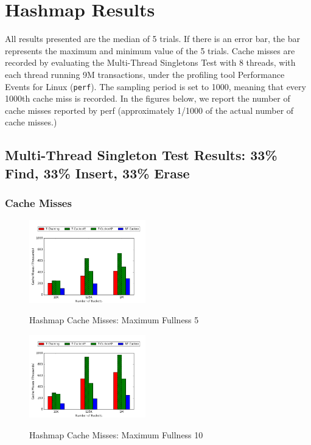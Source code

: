 \chapter{Hashmap Results}
\label{app:hashmaps}

All results presented are the median of 5 trials. If there is an error bar, the bar represents the maximum and minimum value of the 5 trials.
Cache misses are recorded by evaluating the Multi-Thread Singletons Test with 8 threads, with each thread running 9M transactions, under the profiling tool Performance Events for Linux (\texttt{perf}). The sampling period is set to 1000, meaning that every 1000th cache miss is recorded.
In the figures below, we report the number of cache misses reported by perf (approximately 1/1000 of the actual number of cache misses.)

\section{Multi-Thread Singleton Test Results: 33\% Find, 33\% Insert, 33\% Erase}

\subsection{Cache Misses}
\label{app:hm_cm_33}
    \begin{figure}[H]
    \centering
        {\includegraphics[width=0.45\textwidth]{maps/335cm.png}}
        \caption{Hashmap Cache Misses: Maximum Fullness 5}
    \end{figure}

    \begin{figure}[H]
    \centering
        {\includegraphics[width=0.45\textwidth]{maps/3310cm.png}}
        \caption{Hashmap Cache Misses: Maximum Fullness 10}
    \end{figure}

